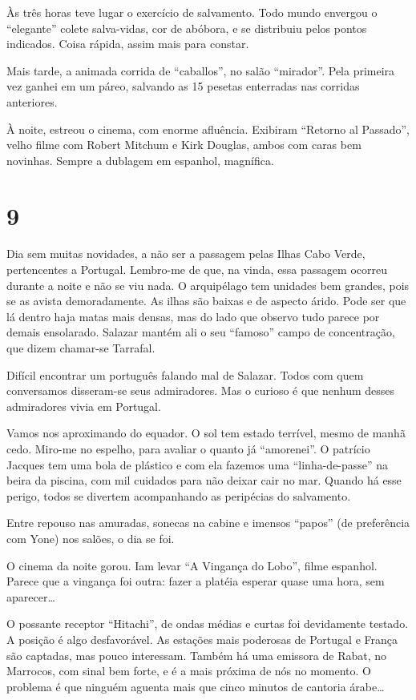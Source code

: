 Às três horas teve lugar o exercício de salvamento. Todo mundo envergou o ``elegante'' colete salva-vidas, cor de abóbora, e se distribuiu pelos pontos indicados. Coisa rápida, assim mais para constar.

Mais tarde, a animada corrida de ``caballos'', no salão ``mirador''. Pela primeira vez ganhei em um páreo, salvando as 15 pesetas enterradas nas corridas anteriores.

À noite, estreou o cinema, com enorme afluência. Exibiram ``Retorno al Passado'', velho filme com Robert Mitchum e Kirk Douglas, ambos com caras bem novinhas. Sempre a dublagem em espanhol, magnífica.

\section*{9 \adfflatleafright {}}
Dia sem muitas novidades, a não ser a passagem pelas Ilhas Cabo Verde, pertencentes a Portugal. Lembro-me de que, na vinda, essa passagem ocorreu durante a noite e não se viu nada. O arquipélago tem unidades bem grandes, pois se as avista demoradamente. As ilhas são baixas e de aspecto árido. Pode ser que lá dentro haja matas mais densas, mas do lado que observo tudo parece por demais ensolarado. Salazar mantém ali o seu ``famoso'' campo de concentração, que dizem chamar-se Tarrafal.

Difícil encontrar um português falando mal de Salazar. Todos com quem conversamos disseram-se seus admiradores. Mas o curioso é que nenhum desses admiradores vivia em Portugal.

Vamos nos aproximando do equador. O sol tem estado terrível, mesmo de manhã cedo. Miro-me no espelho, para avaliar o quanto já ``amorenei''. O patrício Jacques tem uma bola de plástico e com ela fazemos uma ``linha-de-passe'' na beira da piscina, com mil cuidados para não deixar cair no mar. Quando há esse perigo, todos se divertem acompanhando as peripécias do salvamento.

Entre repouso nas amuradas, sonecas na cabine e imensos ``papos'' (de preferência com Yone) nos salões, o dia se foi.

O cinema da noite gorou. Iam levar ``A Vingança do Lobo'', filme espanhol. Parece que a vingança foi outra: fazer a platéia esperar quase uma hora, sem aparecer\ldots

O possante receptor ``Hitachi'', de ondas médias e curtas foi devidamente testado. A posição é algo desfavorável. As estações mais poderosas de Portugal e França são captadas, mas pouco interessam. Também há uma emissora de Rabat, no Marrocos, com sinal bem forte, e é a mais próxima de nós no momento. O problema é que ninguém aguenta mais que cinco minutos de cantoria árabe\ldots


